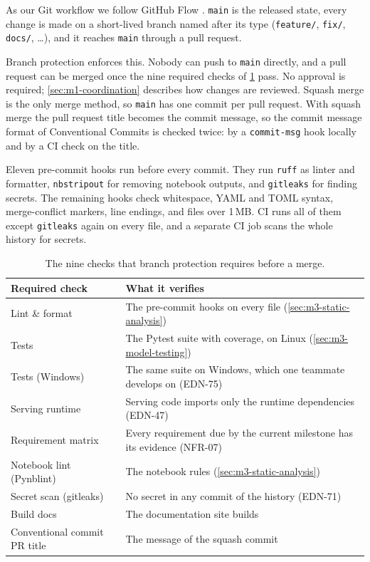 As our Git workflow we follow GitHub Flow \cite{github-flow}.
\texttt{main} is the released state, every change is made on a short-lived branch named after its type (\texttt{feature/}, \texttt{fix/}, \texttt{docs/}, \dots), and it reaches \texttt{main} through a pull request.

Branch protection enforces this.
Nobody can push to \texttt{main} directly, and a pull request can be merged once the nine required checks of \cref{tab:ci-checks} pass.
No approval is required; \cref{sec:m1-coordination} describes how changes are reviewed.
Squash merge is the only merge method, so \texttt{main} has one commit per pull request.
With squash merge the pull request title becomes the commit message, so the commit message format of Conventional Commits \cite{conventional-commits} is checked twice: by a \texttt{commit-msg} hook locally and by a CI check on the title.

Eleven pre-commit hooks run before every commit.
They run \texttt{ruff} as linter and formatter, \texttt{nbstripout} for removing notebook outputs, and \texttt{gitleaks} for finding secrets.
The remaining hooks check whitespace, YAML and TOML syntax, merge-conflict markers, line endings, and files over 1\,MB.
CI runs all of them except \texttt{gitleaks} again on every file, and a separate CI job scans the whole history for secrets.

\begin{table}[ht]
  \centering\small
  \begin{tabularx}{\textwidth}{@{}lX@{}}
    \toprule
    Required check & What it verifies \\
    \midrule
    Lint \& format & The pre-commit hooks on every file (\cref{sec:m3-static-analysis}) \\
    Tests & The Pytest suite with coverage, on Linux (\cref{sec:m3-model-testing}) \\
    Tests (Windows) & The same suite on Windows, which one teammate develops on (EDN-75) \\
    Serving runtime & Serving code imports only the runtime dependencies (EDN-47) \\
    Requirement matrix & Every requirement due by the current milestone has its evidence (\mbox{NFR-07}) \\
    Notebook lint (Pynblint) & The notebook rules (\cref{sec:m3-static-analysis}) \\
    Secret scan (gitleaks) & No secret in any commit of the history (EDN-71) \\
    Build docs & The documentation site builds \\
    Conventional commit PR title & The message of the squash commit \\
    \bottomrule
  \end{tabularx}
  \caption{The nine checks that branch protection requires before a merge.}
  \label{tab:ci-checks}
\end{table}

